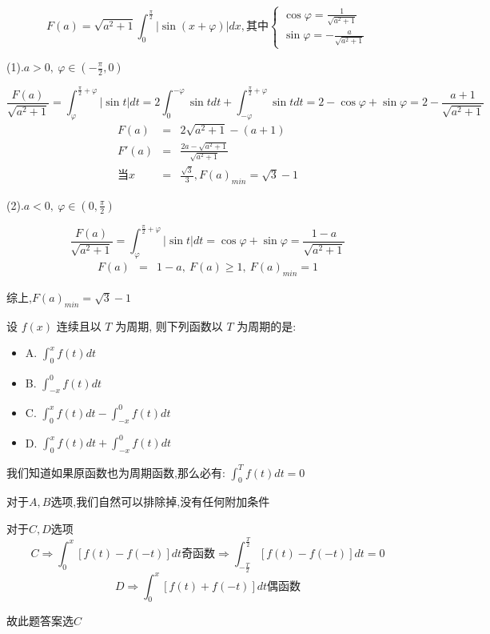 \begin{solution}
	
	$$F(a)=\sqrt{a^2+1}\int_{0}^{\frac{\pi}{2}}|\sin(x+\varphi)|dx,\text{其中}\left\lbrace 
	\begin{array}{l}
		\cos \varphi=\frac{1}{\sqrt{a^2+1}}\\
		\sin \varphi=-\frac{a}{\sqrt{a^2+1}}
	\end{array}
	\right. $$
	
	(1).$a>0,\ \varphi\in(-\frac{\pi}{2},0)$
	
	$$\frac{F(a)}{\sqrt{a^2+1}}=\int_{\varphi}^{\frac{\pi}{2}+\varphi}|\sin t|dt=2\int_{0}^{-\varphi}\sin tdt+\int_{-\varphi}^{\frac{\pi}{2}+\varphi}\sin tdt=2-\cos \varphi+\sin \varphi=2-\frac{a+1}{\sqrt{a^2+1}}$$
	\begin{eqnarray*}
		F(a)&=&2\sqrt{a^2+1}-(a+1)\\ F'(a)&=&\frac{2a-\sqrt{a^2+1}}{\sqrt{a^2+1}}\\
		\text{当}x&=&\frac{\sqrt{3}}{3},F(a)_{min}=\sqrt{3}-1
	\end{eqnarray*}
	
	(2).$a<0,\ \varphi\in(0,\frac{\pi}{2})$
	
	$$\frac{F(a)}{\sqrt{a^2+1}}=\int_{\varphi}^{\frac{\pi}{2}+\varphi}|\sin t|dt=\cos \varphi+\sin \varphi=\frac{1-a}{\sqrt{a^2+1}}$$
	\begin{eqnarray*}
		F(a)&=&1-a,\ F(a)\geq 1,\ F(a)_{min}=1
	\end{eqnarray*}
	
	综上,$F(a)_{min}=\sqrt{3}-1$
\end{solution}

\begin{example}[][Exam: 31.1.12]
	设 $f(x)$ 连续且以 $T$ 为周期, 则下列函数以 $T$ 为周期的是: 
\begin{itemize}
	\item A. $\int_{0}^{x}f(t)dt$ 
	\item B. $\int_{-x}^{0}f(t)dt$ 
	\item C. $\int_{0}^{x}f(t)dt-\int_{-x}^{0}f(t)dt$ 
	\item D. $\int_{0}^{x}f(t)dt+\int_{-x}^{0}f(t)dt$ 
\end{itemize}
\end{example}

\begin{solution}
	
	我们知道如果原函数也为周期函数,那么必有: $\int_{0}^{T}f(t)dt=0$
	
	对于$A,B$选项,我们自然可以排除掉,没有任何附加条件
	
	对于$C,D$选项
	$$C\Rightarrow \int_{0}^{x}[f(t)-f(-t)]dt\text{奇函数}\Rightarrow \int_{-\frac{T}{2}}^{\frac{T}{2}}[f(t)-f(-t)]dt=0$$
	$$D\Rightarrow \int_{0}^{x}[f(t)+f(-t)]dt\text{偶函数}$$
	
	故此题答案选$C$
\end{solution}


